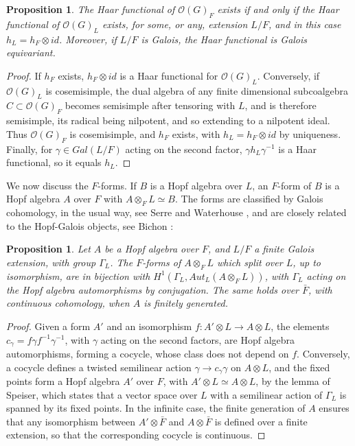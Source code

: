 \documentclass[11pt]{amsart}
\newtheorem{proposition}[theorem]{Proposition}
\theoremstyle{definition}
\begin{document}
\begin{proposition}
\label{p13}
The Haar functional of $\mathcal O(G)_F$ exists if and only if the Haar functional of $\mathcal O(G)_L$ exists, for some, or any, extension $L/F$, and in this case $h_L=h_F\otimes id$. Moreover, if $L/F$ is Galois, the Haar functional is Galois equivariant.
\end{proposition}

\begin{proof}
If $h_F$ exists, $h_F\otimes id$ is a Haar functional for $\mathcal O(G)_L$. Conversely, if $\mathcal O(G)_L$ is cosemisimple, the dual algebra of any finite dimensional subcoalgebra $C\subset\mathcal O(G)_F$ becomes semisimple after tensoring with $L$, and is therefore semisimple, its radical being nilpotent, and so extending to a nilpotent ideal. Thus $\mathcal O(G)_F$ is cosemisimple, and $h_F$ exists, with $h_L=h_F\otimes id$ by uniqueness. Finally, for $\gamma\in Gal(L/F)$ acting on the second factor, $\gamma h_L\gamma^{-1}$ is a Haar functional, so it equals $h_L$.
\end{proof}

We now discuss the $F$-forms. If $B$ is a Hopf algebra over $L$, an $F$-form of $B$ is a Hopf algebra $A$ over $F$ with $A\otimes_FL\simeq B$. The forms are classified by Galois cohomology, in the usual way, see Serre \cite{se1} and Waterhouse \cite{wat}, and are closely related to the Hopf-Galois objects, see Bichon \cite{bi4}:

\begin{proposition}
\label{p14}
Let $A$ be a Hopf algebra over $F$, and $L/F$ a finite Galois extension, with group $\Gamma_L$. The $F$-forms of $A\otimes_FL$ which split over $L$, up to isomorphism, are in bijection with $H^1(\Gamma_L,Aut_L(A\otimes_FL))$, with $\Gamma_L$ acting on the Hopf algebra automorphisms by conjugation. The same holds over $\bar F$, with continuous cohomology, when $A$ is finitely generated.
\end{proposition}

\begin{proof}
Given a form $A'$ and an isomorphism $f:A'\otimes L\to A\otimes L$, the elements $c_\gamma=f\gamma f^{-1}\gamma^{-1}$, with $\gamma$ acting on the second factors, are Hopf algebra automorphisms, forming a cocycle, whose class does not depend on $f$. Conversely, a cocycle defines a twisted semilinear action $\gamma\to c_\gamma\gamma$ on $A\otimes L$, and the fixed points form a Hopf algebra $A'$ over $F$, with $A'\otimes L\simeq A\otimes L$, by the lemma of Speiser, which states that a vector space over $L$ with a semilinear action of $\Gamma_L$ is spanned by its fixed points. In the infinite case, the finite generation of $A$ ensures that any isomorphism between $A'\otimes\bar F$ and $A\otimes\bar F$ is defined over a finite extension, so that the corresponding cocycle is continuous.
\end{proof}
\end{document}
